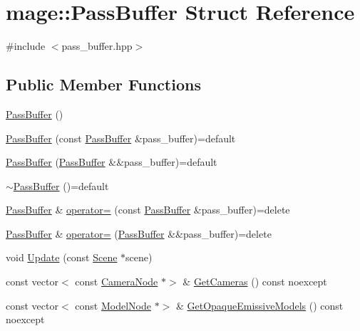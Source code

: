 \hypertarget{structmage_1_1_pass_buffer}{}\section{mage\+:\+:Pass\+Buffer Struct Reference}
\label{structmage_1_1_pass_buffer}


{\ttfamily \#include $<$pass\+\_\+buffer.\+hpp$>$}

\subsection*{Public Member Functions}
\begin{DoxyCompactItemize}
\item 
\hyperlink{structmage_1_1_pass_buffer_a02e07a26327f6e57b193521636bb8e10}{Pass\+Buffer} ()
\item 
\hyperlink{structmage_1_1_pass_buffer_a1c6e779725227ebbb8e3d15a4515edbc}{Pass\+Buffer} (const \hyperlink{structmage_1_1_pass_buffer}{Pass\+Buffer} \&pass\+\_\+buffer)=default
\item 
\hyperlink{structmage_1_1_pass_buffer_a8f6baa279c6dc8c5b6869240d0169677}{Pass\+Buffer} (\hyperlink{structmage_1_1_pass_buffer}{Pass\+Buffer} \&\&pass\+\_\+buffer)=default
\item 
\hyperlink{structmage_1_1_pass_buffer_a650dec579522b7d5c5810a535b10773a}{$\sim$\+Pass\+Buffer} ()=default
\item 
\hyperlink{structmage_1_1_pass_buffer}{Pass\+Buffer} \& \hyperlink{structmage_1_1_pass_buffer_a8d0cc48dea7dfb6b710b6162b3a82b7e}{operator=} (const \hyperlink{structmage_1_1_pass_buffer}{Pass\+Buffer} \&pass\+\_\+buffer)=delete
\item 
\hyperlink{structmage_1_1_pass_buffer}{Pass\+Buffer} \& \hyperlink{structmage_1_1_pass_buffer_a8a5832066c415bea077107c7a9d18df5}{operator=} (\hyperlink{structmage_1_1_pass_buffer}{Pass\+Buffer} \&\&pass\+\_\+buffer)=delete
\item 
void \hyperlink{structmage_1_1_pass_buffer_a6b73eb28fac15b121ff013b03ab643f8}{Update} (const \hyperlink{classmage_1_1_scene}{Scene} $\ast$scene)
\item 
const vector$<$ const \hyperlink{classmage_1_1_camera_node}{Camera\+Node} $\ast$$>$ \& \hyperlink{structmage_1_1_pass_buffer_a1b3745dab0028b470c76c695e55f6466}{Get\+Cameras} () const noexcept
\item 
const vector$<$ const \hyperlink{classmage_1_1_model_node}{Model\+Node} $\ast$$>$ \& \hyperlink{structmage_1_1_pass_buffer_a1fcbb01cc67df0152046ceb2c9133b9a}{Get\+Opaque\+Emissive\+Models} () const noexcept

\end{DoxyCompactItemize}
